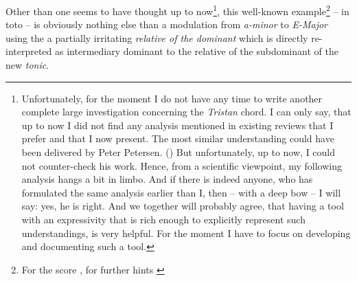 \documentclass[
  DIV=calc,
  BCOR=5mm,
  12pt,
  headings=small,
  oneside,
  abstract=true,
  toc=bib,
  xcolor=dvipsnames,
  openany,
  ngerman,english]{scrartcl}
\newcommand{\acc}[0]{\textit}
\begin{document}
\begin{center}
\end{center}

Other than one seems to have thought up to now\footnote{Unfortunately, for the
moment I do not have any time to write another complete large investigation
concerning the \acc{Tristan} chord. I can only say, that up to now I did not
find any analysis mentioned in existing reviews that I prefer and that I now
present. The most similar understanding could have been delivered by Peter
Petersen. (\cite[cf.][49ff]{Petersen2019a}) But unfortunately, up to now, I could
not counter-check his work. Hence, from a scientific viewpoint, my following
analysis hangs a bit in limbo. And if there is indeed anyone, who has formulated
the same analysis earlier than I, then -- with a deep bow -- I will say: yes, he
is right. And we together will probably agree, that having a tool with an
expressivity that is rich enough to explicitly represent such understandings,
is very helpful. For the moment I have to focus on developing and documenting
such a tool.}, this well-known example\footnote{For the score
\cite[cf.][\nopage]{wpTristan2019b}, for further hints
\cite[cf.][\nopage]{wpTristan2019a}} -- in toto -- is obviously nothing else
than a modulation from \acc{a-minor} to \acc{E-Major} using the a partially
irritating \acc{relative of the dominant} which is directly re-interpreted as
intermediary dominant to the relative of the subdominant of the new \acc{tonic}.
\end{document}
